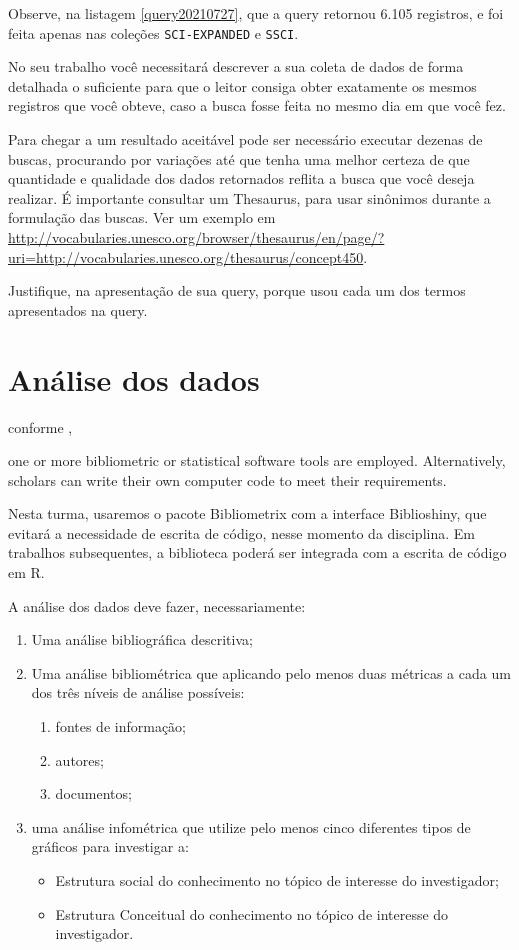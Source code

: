 Observe, na listagem \ref{query20210727}, que a query retornou 6.105 registros, e foi feita apenas nas coleções \texttt{SCI-EXPANDED} e \texttt{SSCI}.

No seu trabalho você necessitará descrever a sua coleta de dados de forma detalhada o suficiente para que o leitor consiga obter exatamente os mesmos registros que você obteve, caso a busca fosse feita no mesmo dia em que você fez.

Para chegar a um resultado aceitável pode ser necessário executar dezenas de buscas, procurando por variações até que tenha uma melhor certeza de que quantidade e qualidade dos dados retornados reflita a busca que você deseja realizar.
É importante consultar um Thesaurus, para usar sinônimos durante a formulação das buscas. Ver um exemplo em \url{http://vocabularies.unesco.org/browser/thesaurus/en/page/?uri=http://vocabularies.unesco.org/thesaurus/concept450}.


Justifique, na apresentação de sua query, porque usou cada um dos termos apresentados na query.

\section{Análise dos dados}

conforme \cite{aria_bibliometrix_2017}, 
\begin{itquote}
one or more bibliometric or statistical software tools are employed. Alternatively, scholars can write
their own computer code to meet their requirements.    
\end{itquote}
Nesta turma, usaremos o pacote Bibliometrix com a interface Biblioshiny, que evitará a necessidade de escrita de código, nesse momento da disciplina.
Em trabalhos subsequentes, a biblioteca poderá ser integrada com a escrita de código em R.

A análise dos dados deve fazer, necessariamente:
\begin{enumerate}
    \item Uma análise bibliográfica descritiva;
    \item Uma análise bibliométrica que aplicando pelo menos duas métricas a cada um dos três níveis de análise possíveis:
    \begin{enumerate}
        \item fontes de informação;
        \item autores;
        \item documentos;
    \end{enumerate}
    \item uma análise infométrica que utilize pelo menos cinco diferentes tipos de gráficos para investigar a:
    \begin{itemize}
        \item Estrutura social do conhecimento no tópico de interesse do investigador;
        \item Estrutura Conceitual do conhecimento no tópico de interesse do investigador.
    \end{itemize}
    
\end{enumerate}

